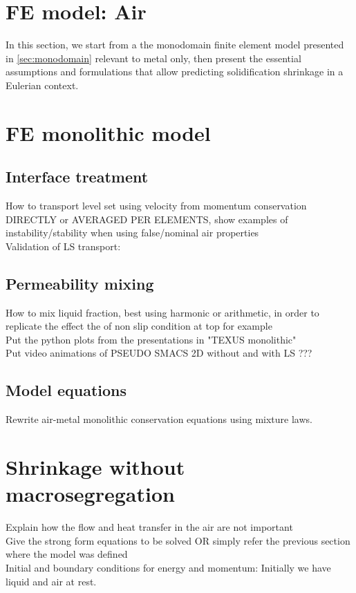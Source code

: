 \section{FE model: Air}
In this section, we start from a the monodomain finite element model presented in \cref{sec:monodomain} relevant to metal only, 
then present the essential assumptions and formulations that allow predicting solidification shrinkage in a Eulerian context.


\section{FE monolithic model}
\subsection{Interface treatment}
How to transport level set using velocity from momentum conservation DIRECTLY or AVERAGED PER ELEMENTS, 
show examples of instability/stability when using false/nominal air properties \\ 
Validation of LS transport:
\subsection{Permeability mixing}
How to mix liquid fraction, best using harmonic or arithmetic, in order to replicate the effect the of non slip condition at top for example \\
Put the python plots from the presentations in "TEXUS monolithic" \\
Put video animations of PSEUDO SMACS 2D without and with LS ???
\subsection{Model equations}
Rewrite air-metal monolithic conservation equations using mixture laws.
\section{Shrinkage without macrosegregation}
Explain how the flow and heat transfer in the air are not important \\ 
Give the strong form equations to be solved OR simply refer the previous section where the model was defined \\
Initial and boundary conditions for energy and momentum:  Initially we have liquid and air at rest. 
